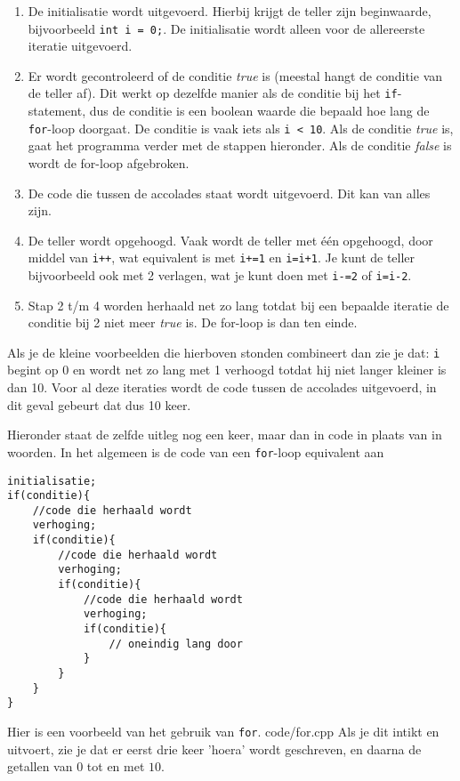 \documentclass[12pt,a4paper]{article}
\newcommand{\code}{}
\newcommand{\icode}{\lstinline}
\begin{document}
\begin{enumerate}
	\item De initialisatie wordt uitgevoerd. Hierbij krijgt de teller zijn beginwaarde, bijvoorbeeld \icode{int i = 0;}. De initialisatie wordt alleen voor de allereerste iteratie uitgevoerd. 
	\item Er wordt gecontroleerd of de conditie \emph{true} is (meestal hangt de conditie van de teller af). Dit werkt op dezelfde manier als de conditie bij het \icode{if}-statement, dus de conditie is een boolean waarde die bepaald hoe lang de \icode{for}-loop doorgaat. De conditie is vaak iets als \icode{i < 10}. Als de conditie \emph{true} is, gaat het programma verder met de stappen hieronder. Als de conditie \emph{false} is wordt de for-loop afgebroken. 
	\item De code die tussen de accolades staat wordt uitgevoerd. Dit kan van alles zijn. 
	\item De teller wordt opgehoogd. Vaak wordt de teller met \'e\'en opgehoogd, door middel van \icode{i++}, wat equivalent is met \icode{i+=1} en \icode{i=i+1}. Je kunt de teller bijvoorbeeld ook met 2 verlagen, wat je kunt doen met \icode{i-=2} of \icode{i=i-2}.
	\item Stap 2 t/m 4 worden herhaald net zo lang totdat bij een bepaalde iteratie de conditie bij 2 niet meer \emph{true} is. De for-loop is dan ten einde. 
\end{enumerate}

Als je de kleine voorbeelden die hierboven stonden combineert dan zie je dat: \icode{i} begint op 0 en wordt net zo lang met 1 verhoogd totdat hij niet langer kleiner is dan 10. Voor al deze iteraties wordt de code tussen de accolades uitgevoerd, in dit geval gebeurt dat dus 10 keer. 

Hieronder staat de zelfde uitleg nog een keer, maar dan in code in plaats van in woorden. In het algemeen is de code van een \icode{for}-loop equivalent aan
\begin{lstlisting}
initialisatie;
if(conditie){
	//code die herhaald wordt
	verhoging;
	if(conditie){
		//code die herhaald wordt
		verhoging;
		if(conditie){
			//code die herhaald wordt
			verhoging;
			if(conditie){
				// oneindig lang door
			}
		}
	}
}
\end{lstlisting}
Hier is een voorbeeld van het gebruik van \icode{for}.
\code{code/for.cpp}
Als je dit intikt en uitvoert, zie je dat er eerst drie keer 'hoera' wordt geschreven, en daarna de getallen van $0$ tot en met $10$.
\end{document}
